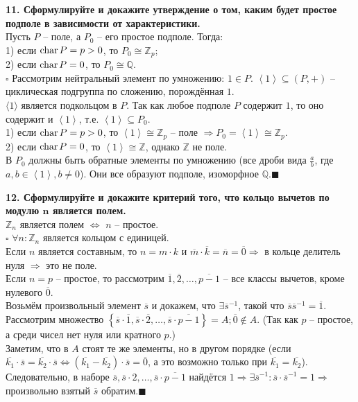 \documentclass[11pt,a4paper]{article}
\newcommand{\Z}{\mathbb{Z}}
\newcommand{\Q}{\mathbb{Q}}
\newcommand{\Char}[1]{\mathrm{char}\hspace{0.5mm}#1}
\newcommand{\proof}{$\square$ }
\newcommand{\qed}{\hfill$\blacksquare$}
\begin{document}
\textbf{11. Сформулируйте и докажите утверждение о том, каким будет простое подполе в зависимости от характеристики.\\}
Пусть $P$ -- поле, а $P_0$ -- его простое подполе. Тогда:\\
1) если $\Char{P} = p > 0$, то $P_0 \cong \Z_p$;\\
2) если $\Char{P} = 0$, то $P_0 \cong \Q$.\\
\proof Рассмотрим нейтральный элемент по умножению: $1 \in P$. $\left\langle 1 \right\rangle \subseteq \left( P, + \right)$ -- циклическая подгруппа по сложению, порождённая $1$.\\
$\langle 1 \rangle$ является подкольцом в $P$. Так как любое подполе $P$ содержит $1$, то оно содержит и $\left\langle 1 \right\rangle$, т.е. $\left\langle 1 \right\rangle \subseteq P_0$.\\
1) если $\Char{P} = p > 0$, то $\left\langle 1 \right\rangle \cong \Z_p$ -- поле $\Rightarrow P_0 = \left\langle 1 \right\rangle \cong \Z_p$.\\
2) если $\Char{P} = 0$, то $\left\langle 1 \right\rangle \cong \Z$, однако $\Z$ не поле.\\
В $P_0$ должны быть обратные элементы по умножению (все дроби вида $\frac{a}{b}$, где $a, b \in \left\langle 1 \right\rangle, b \neq 0$). Они все образуют подполе, изоморфное $\Q$.\qed

\textbf{12. Сформулируйте и докажите критерий того, что кольцо вычетов по модулю $\boldsymbol{n}$ является полем.\\}
$\Z_n$ является полем $\Leftrightarrow$ $n$ -- простое.\\
\proof $\forall n: \Z_n$ является кольцом с единицей.\\
Если $n$ является составным, то $n = m \cdot k$ и $\overline{m} \cdot \overline{k} = \overline{n} = \overline{0} \Rightarrow$ в кольце делитель нуля $\Rightarrow$ это не поле.\\
Если $n = p$ -- простое, то рассмотрим $\overline{1}, \overline{2}, \hdots, \overline{p - 1}$ -- все классы вычетов, кроме нулевого $\overline{0}$.\\
Возьмём произвольный элемент $\overline{s}$ и докажем, что $\exists \overline{s}^{-1}$, такой что $\overline{s} \overline{s}^{-1} = \overline{1}$. Рассмотрим множество $\left\{ \overline{s} \cdot \overline{1}, \overline{s} \cdot \overline{2}, \hdots, \overline{s} \cdot \overline{p - 1} \right\} = A; \overline{0} \not\in A$. (Так как $p$ -- простое, а среди чисел нет нуля или кратного $p$.)\\
Заметим, что в $A$ стоят те же элементы, но в другом порядке (если $\overline{k_1} \cdot \overline{s} = \overline{k_2} \cdot \overline{s} \Leftrightarrow \left( \overline{k_1} - \overline{k_2} \right) \cdot \overline{s} = \overline{0}$, а это возможно только при $\overline{k_1} = \overline{k_2}$).\\
Следовательно, в наборе $\overline{s}, \overline{s} \cdot 2, \hdots, \overline{s} \cdot \overline{p - 1}$ найдётся $1 \Rightarrow \exists \overline{s}^{-1}: \overline{s} \cdot \overline{s}^{-1} = 1 \Rightarrow$ произвольно взятый $\overline{s}$ обратим.\qed
\end{document}
